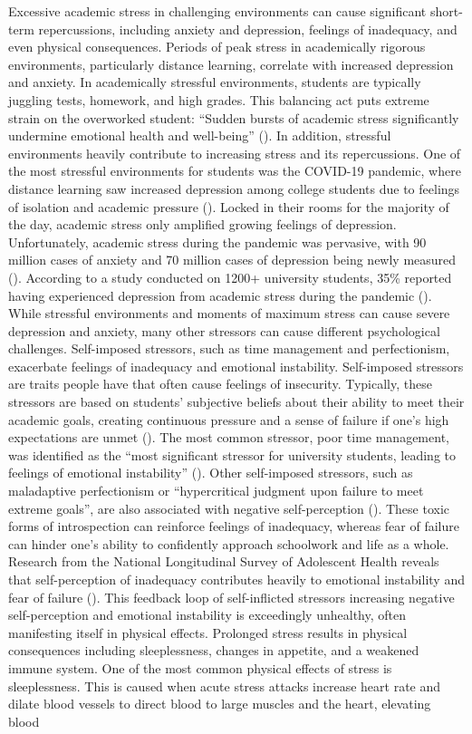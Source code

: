 Excessive academic stress in challenging environments can cause significant short-term repercussions, including anxiety and depression, feelings of inadequacy, and even physical consequences. Periods of peak stress in academically rigorous environments, particularly distance learning, correlate with increased depression and anxiety. In academically stressful environments, students are typically juggling tests, homework, and high grades. This balancing act puts extreme strain on the overworked student: “Sudden bursts of academic stress significantly undermine emotional health and well-being” (\cite{claney2023}). In addition, stressful environments heavily contribute to increasing stress and its repercussions. One of the most stressful environments for students was the COVID-19 pandemic, where distance learning saw increased depression among college students due to feelings of isolation and academic pressure (\cite{chen2024}). Locked in their rooms for the majority of the day, academic stress only amplified growing feelings of depression. Unfortunately, academic stress during the pandemic was pervasive, with 90 million cases of anxiety and 70 million cases of depression being newly measured (\cite{cordovaolivera2023}). According to a study conducted on 1200+ university students, 35\% reported having experienced depression from academic stress during the pandemic (\cite{cordovaolivera2023}). While stressful environments and moments of maximum stress can cause severe depression and anxiety, many other stressors can cause different psychological challenges. Self-imposed stressors, such as time management and perfectionism, exacerbate feelings of inadequacy and emotional instability. Self-imposed stressors are traits people have that often cause feelings of insecurity. Typically, these stressors are based on students' subjective beliefs about their ability to meet their academic goals, creating continuous pressure and a sense of failure if one’s high expectations are unmet (\cite{cordovaolivera2023}). The most common stressor, poor time management, was identified as the “most significant stressor for university students, leading to feelings of emotional instability” (\cite{cordovaolivera2023}). Other self-imposed stressors, such as maladaptive perfectionism or “hypercritical judgment upon failure to meet extreme goals”, are also associated with negative self-perception (\cite{almroth2019}). These toxic forms of introspection can reinforce feelings of inadequacy, whereas fear of failure can hinder one’s ability to confidently approach schoolwork and life as a whole. Research from the National Longitudinal Survey of Adolescent Health reveals that self-perception of inadequacy contributes heavily to emotional instability and fear of failure (\cite{mcleod2012}). This feedback loop of self-inflicted stressors increasing negative self-perception and emotional instability is exceedingly unhealthy, often manifesting itself in physical effects. Prolonged stress results in physical consequences including sleeplessness, changes in appetite, and a weakened immune system. One of the most common physical effects of stress is sleeplessness. This is caused when acute stress attacks increase heart rate and dilate blood vessels to direct blood to large muscles and the heart, elevating blood 